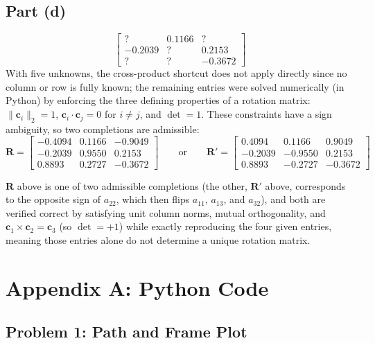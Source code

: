 \documentclass[11pt]{article}
\newcommand{\R}{\bm{R}}
\begin{document}
\subsection*{Part (d)}
\[
    \begin{bmatrix}
        ? & 0.1166 & ? \\
        -0.2039 & ? & 0.2153 \\
        ? & ? & -0.3672
    \end{bmatrix}
\]
With five unknowns, the cross-product shortcut does not apply directly since no column or row is fully known; the remaining entries were solved numerically (in Python) by enforcing the three defining properties of a rotation matrix: $\lVert\bm c_i\rVert_2=1$, $\bm c_i\cdot\bm c_j=0$ for $i\neq j$, and $\det=1$. These constraints have a sign ambiguity, so two completions are admissible:
\[
    \R = \begin{bmatrix}
        -0.4094 & 0.1166 & -0.9049 \\
        -0.2039 & 0.9550 & 0.2153 \\
        0.8893 & 0.2727 & -0.3672
    \end{bmatrix}
    \qquad\text{or}\qquad
    \R' = \begin{bmatrix}
        0.4094 & 0.1166 & 0.9049 \\
        -0.2039 & -0.9550 & 0.2153 \\
        0.8893 & -0.2727 & -0.3672
    \end{bmatrix}
\]
\begin{result}
$\R$ above is one of two admissible completions (the other, $\R'$ above, corresponds to the opposite sign of $a_{22}$, which then flips $a_{11}$, $a_{13}$, and $a_{32}$), and both are verified correct by satisfying unit column norms, mutual orthogonality, and $\bm c_1\times\bm c_2=\bm c_3$ (so $\det=+1$) while exactly reproducing the four given entries, meaning those entries alone do not determine a unique rotation matrix.
\end{result}

\newpage
\section*{Appendix A: Python Code}

\subsection*{Problem 1: Path and Frame Plot}

\end{document}
